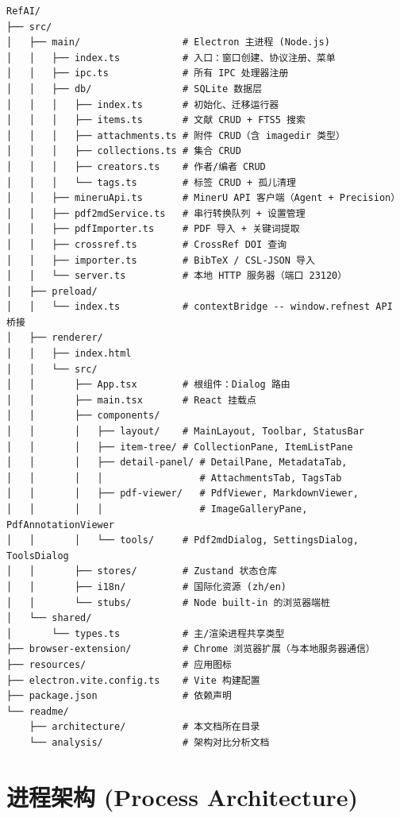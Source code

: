 \documentclass[12pt, a4paper]{article}
\begin{document}
\begin{lstlisting}[language={},numbers=none]
RefAI/
├── src/
│   ├── main/                  # Electron 主进程 (Node.js)
│   │   ├── index.ts           # 入口：窗口创建、协议注册、菜单
│   │   ├── ipc.ts             # 所有 IPC 处理器注册
│   │   ├── db/                # SQLite 数据层
│   │   │   ├── index.ts       # 初始化、迁移运行器
│   │   │   ├── items.ts       # 文献 CRUD + FTS5 搜索
│   │   │   ├── attachments.ts # 附件 CRUD（含 imagedir 类型）
│   │   │   ├── collections.ts # 集合 CRUD
│   │   │   ├── creators.ts    # 作者/编者 CRUD
│   │   │   └── tags.ts        # 标签 CRUD + 孤儿清理
│   │   ├── mineruApi.ts       # MinerU API 客户端（Agent + Precision）
│   │   ├── pdf2mdService.ts   # 串行转换队列 + 设置管理
│   │   ├── pdfImporter.ts     # PDF 导入 + 关键词提取
│   │   ├── crossref.ts        # CrossRef DOI 查询
│   │   ├── importer.ts        # BibTeX / CSL-JSON 导入
│   │   └── server.ts          # 本地 HTTP 服务器（端口 23120）
│   ├── preload/
│   │   └── index.ts           # contextBridge -- window.refnest API 桥接
│   ├── renderer/
│   │   ├── index.html
│   │   └── src/
│   │       ├── App.tsx        # 根组件：Dialog 路由
│   │       ├── main.tsx       # React 挂载点
│   │       ├── components/
│   │       │   ├── layout/    # MainLayout, Toolbar, StatusBar
│   │       │   ├── item-tree/ # CollectionPane, ItemListPane
│   │       │   ├── detail-panel/ # DetailPane, MetadataTab,
│   │       │   │                 # AttachmentsTab, TagsTab
│   │       │   ├── pdf-viewer/   # PdfViewer, MarkdownViewer,
│   │       │   │                 # ImageGalleryPane, PdfAnnotationViewer
│   │       │   └── tools/     # Pdf2mdDialog, SettingsDialog, ToolsDialog
│   │       ├── stores/        # Zustand 状态仓库
│   │       ├── i18n/          # 国际化资源 (zh/en)
│   │       └── stubs/         # Node built-in 的浏览器端桩
│   └── shared/
│       └── types.ts           # 主/渲染进程共享类型
├── browser-extension/         # Chrome 浏览器扩展（与本地服务器通信）
├── resources/                 # 应用图标
├── electron.vite.config.ts    # Vite 构建配置
├── package.json               # 依赖声明
└── readme/
    ├── architecture/          # 本文档所在目录
    └── analysis/              # 架构对比分析文档
\end{lstlisting}

\section{进程架构 (Process Architecture)}
\end{document}
